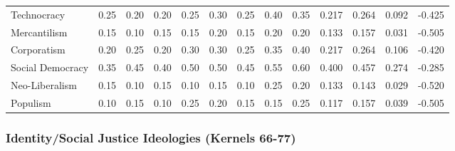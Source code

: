 \documentclass[11pt,a4paper]{article}
\theoremstyle{definition}
\theoremstyle{remark}
\begin{document}
\begin{table}[H]
\begin{tabular}{@{}l|ccccccc|c|cccc@{}}
Technocracy & 0.25 & 0.20 & 0.20 & 0.25 & 0.30 & 0.25 & 0.40 & 0.35 & 0.217 & 0.264 & 0.092 & -0.425 \\
Mercantilism & 0.15 & 0.10 & 0.15 & 0.15 & 0.20 & 0.15 & 0.20 & 0.20 & 0.133 & 0.157 & 0.031 & -0.505 \\
Corporatism & 0.20 & 0.25 & 0.20 & 0.30 & 0.30 & 0.25 & 0.35 & 0.40 & 0.217 & 0.264 & 0.106 & -0.420 \\
Social Democracy & 0.35 & 0.45 & 0.40 & 0.50 & 0.50 & 0.45 & 0.55 & 0.60 & 0.400 & 0.457 & 0.274 & -0.285 \\
Neo-Liberalism & 0.15 & 0.10 & 0.15 & 0.10 & 0.15 & 0.10 & 0.25 & 0.20 & 0.133 & 0.143 & 0.029 & -0.520 \\
Populism & 0.10 & 0.15 & 0.10 & 0.25 & 0.20 & 0.15 & 0.15 & 0.25 & 0.117 & 0.157 & 0.039 & -0.505 \\
\bottomrule
\end{tabular}
\end{table}

\subsubsection{Identity/Social Justice Ideologies (Kernels 66-77)}
\end{document}
